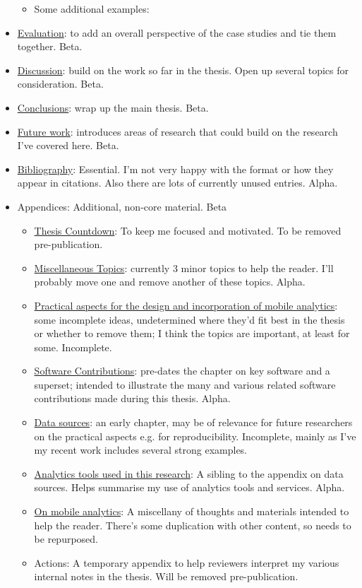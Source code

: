 \begin{itemize}
\begin{itemize}
        \item Some additional examples:
    \end{itemize}
    \item \href{chapter-evaluation}{Evaluation}: to add an overall perspective of the case studies and tie them together. Beta.
    \item \href{chapter-discussion}{Discussion}: build on the work so far in the thesis. Open up several topics for consideration. Beta.
    \item \href{chapter-conclusions}{Conclusions}: wrap up the main thesis. Beta.
    \item \href{chapter-future-work}{Future work}: introduces areas of research that could build on the research I've covered here. Beta.
    \item \href{the-bibliography-follows}{Bibliography}: Essential. I'm not very happy with the format or how they appear in citations. Also there are lots of currently unused entries. Alpha.
    \item Appendices: Additional, non-core material. Beta
    \begin{itemize}
        \item \href{app:thesis-countdown}{Thesis Countdown}: To keep me focused and motivated. To be removed pre-publication.
        \item \href{app:miscellaneous-topics}{Miscellaneous Topics}: currently 3 minor topics to help the reader. I'll probably move one and remove another of these topics. Alpha.
        \item \href{app:practical-aspects}{Practical aspects for the design and incorporation of mobile analytics}: some incomplete ideas, undetermined where they'd fit best in the thesis or whether to remove them; I think the topics are important, at least for some. Incomplete.
        \item \href{app:software-contributions}{Software Contributions}: pre-dates the chapter on key software and a superset; intended to illustrate the many and various related software contributions made during this thesis. Alpha.
        \item \href{app:data-sources}{Data sources}: an early chapter, may be of relevance for future researchers on the practical aspects e.g. for reproducibility. Incomplete, mainly as I've my recent work includes several strong examples.
        \item \href{appendix-analytics-tools}{Analytics tools used in this research}: A sibling to the appendix on data sources. Helps summarise my use of analytics tools and services. Alpha.
        \item \href{appendix-on-mobile-analytics}{On mobile analytics}: A miscellany of thoughts and materials intended to help the reader. There's some duplication with other content, so needs to be repurposed.
        \item Actions: A temporary appendix to help reviewers interpret my various internal notes in the thesis. Will be removed pre-publication.
    \end{itemize}
    
\end{itemize}

